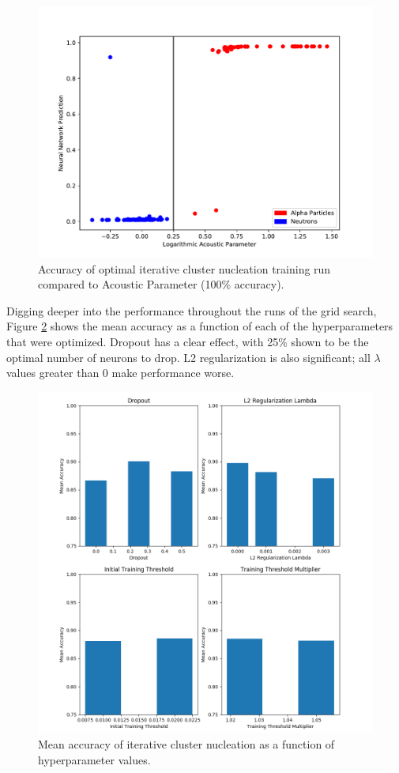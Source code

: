 \documentclass[10pt]{article}
\begin{document}
\begin{figure}[h]
    \centering
    \includegraphics[width=\textwidth]{icn_grid_search}
    \caption{\label{icn_grid_search} Accuracy of optimal iterative cluster nucleation training run compared to Acoustic Parameter (100\% accuracy).}
\end{figure}

Digging deeper into the performance throughout the runs of the grid search, Figure \ref{icn_acc_by_hyper} shows the mean accuracy as a function of each of the hyperparameters that were optimized. Dropout has a clear effect, with 25\% shown to be the optimal number of neurons to drop. L2 regularization is also significant; all $\lambda$ values greater than 0 make performance worse.

\begin{figure}[H]
    \centering
    \includegraphics[width=\textwidth]{icn_acc_by_hyper}
    \caption{\label{icn_acc_by_hyper} Mean accuracy of iterative cluster nucleation as a function of hyperparameter values.}
\end{figure}
\end{document}
